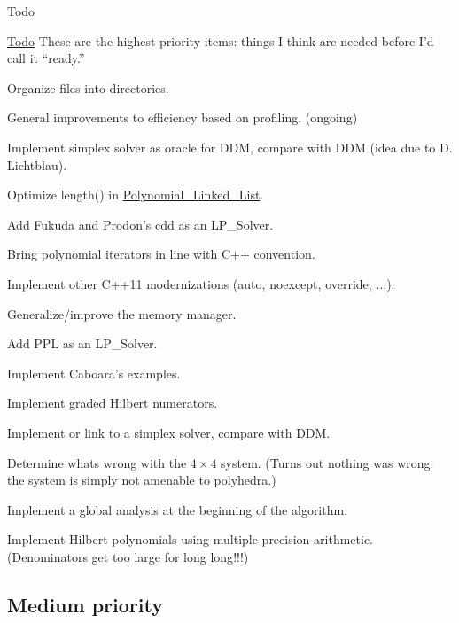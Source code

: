 \begin{DoxyRefDesc}{Todo}
\item[\hyperlink{todo__todo000001}{Todo}]These are the highest priority items\+: things I think are needed before I'd call it ``ready.''
\begin{DoxyItemize}
\item Organize files into directories.
\item General improvements to efficiency based on profiling. (ongoing)
\item Implement simplex solver as oracle for D\+DM, compare with D\+DM (idea due to D. Lichtblau).
\item Optimize length() in \hyperlink{group__polygroup_class_polynomial___linked___list}{Polynomial\+\_\+\+Linked\+\_\+\+List}.
\item Add Fukuda and Prodon's cdd as an L\+P\+\_\+\+Solver. \cite{Fukuda_DoubleDescriptionRevisited}
\item Bring polynomial iterators in line with C++ convention.
\item Implement other C++11 modernizations ({\ttfamily auto}, {\ttfamily noexcept}, {\ttfamily override}, {$\dots$}).
\item Generalize/improve the memory manager.
\item Add P\+PL as an L\+P\+\_\+\+Solver. \cite{BagnaraHZ08SCP}
\item Implement Caboara's examples.
\item Implement graded Hilbert numerators.
\item Implement or link to a simplex solver, compare with D\+DM.
\item Determine what\textquotesingle{}s wrong with the $4\times4$ system. (Turns out nothing was wrong\+: the system is simply not amenable to polyhedra.)
\item Implement a global analysis at the beginning of the algorithm.
\item Implement Hilbert polynomials using multiple-\/precision arithmetic. (Denominators get too large for {\ttfamily long long}!!!)
\end{DoxyItemize}\end{DoxyRefDesc}
\hypertarget{index_mdpri}{}\subsection{Medium priority}\label{index_mdpri}
